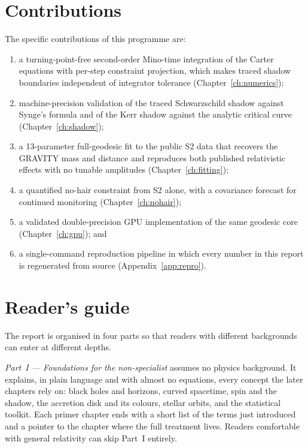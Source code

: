 \section{Contributions}
\label{sec:contributions}

The specific contributions of this programme are:
\begin{enumerate}
\item a turning-point-free second-order Mino-time integration of the Carter
equations with per-step constraint projection, which makes traced shadow
boundaries independent of integrator tolerance
(Chapter~\ref{ch:numerics});
\item machine-precision validation of the traced Schwarzschild shadow
against Synge's formula and of the Kerr shadow against the analytic
critical curve (Chapter~\ref{ch:shadow});
\item a 13-parameter full-geodesic fit to the public S2 data that
recovers the GRAVITY mass and distance and reproduces both published
relativistic effects with no tunable amplitudes
(Chapter~\ref{ch:fitting});
\item a quantified no-hair constraint from S2 alone, with a covariance
forecast for continued monitoring (Chapter~\ref{ch:nohair});
\item a validated double-precision GPU implementation of the same geodesic
core (Chapter~\ref{ch:gpu}); and
\item a single-command reproduction pipeline in which every number in
this report is regenerated from source (Appendix~\ref{app:repro}).
\end{enumerate}

\section{Reader's guide}
\label{sec:readersguide}

The report is organised in four parts so that readers with different
backgrounds can enter at different depths.

\emph{Part~I — Foundations for the non-specialist} assumes no physics
background. It explains, in plain language and with almost no equations,
every concept the later chapters rely on: black holes and horizons, curved
spacetime, spin and the shadow, the accretion disk and its colours, stellar
orbits, and the statistical toolkit. Each primer chapter ends with a short
list of the terms just introduced and a pointer to the chapter where the
full treatment lives. Readers comfortable with general relativity can skip
Part~I entirely.


